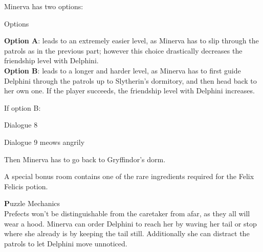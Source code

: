 Minerva has two options: \\

\begin{dialogue}{Options}
\end{dialogue} 

\textbf{Option A}: leads to an extremely easier level, as Minerva has to slip through the patrols as in the previous part; however this choice drastically decreases the friendship level with Delphini. \\
\textbf{Option B}: leads to a longer and harder level, as Minerva has to first guide Delphini through the patrols up to Slytherin's dormitory, and then head back to her own one. If the player succeeds, the friendship level with Delphini increases.


If option B: \\
   
\begin{dialogue}{Dialogue 8} 
\end{dialogue} 
 
\begin{dialogue}{Dialogue 9} 
	\*meows angrily\*
\end{dialogue} 

Then Minerva has to go back to Gryffindor's dorm.

A special bonus room contains one of the rare ingredients required for the Felix Felicis potion.

\textbf Puzzle Mechanics \\

Prefects won't be distinguishable from the caretaker from afar, as they all will wear a hood. Minerva can order Delphini to reach her by waving her tail or stop where she already is by keeping the tail still. Additionally she can distract the patrols to let Delphini move unnoticed. \\

